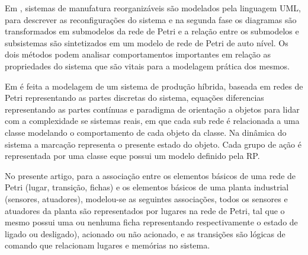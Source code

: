 Em \cite{design}, 
sistemas de manufatura reorganizáveis são modelados pela linguagem UML, para descrever as reconfigurações do sistema e na segunda fase  os diagramas são transformados em submodelos da rede de Petri e a relação entre os submodelos e subsistemas são sintetizados em um modelo de rede de Petri de auto nível. Os dois métodos podem analisar comportamentos importantes em relação as propriedades do sistema que são vitais para a modelagem prática dos mesmos.

Em \cite{hybridOO} 
é feita a modelagem de um sistema de produção híbrida, baseada em redes de Petri representando as partes discretas do sistema, equações diferencias representando as partes contínuas e paradigma de orientação a objetos para lidar com a complexidade se sistemas reais, em que cada sub rede é relacionada a uma classe modelando o comportamento de cada objeto da classe. Na dinâmica do sistema a marcação representa o presente estado do objeto. Cada grupo de ação é representada por uma classe eque possui um modelo definido pela RP. 

No presente artigo, para a associação entre os elementos básicos de uma rede de Petri (lugar, transição, fichas) e os elementos básicos de uma planta industrial (sensores, atuadores), modelou-se as seguintes associações, todos os sensores e atuadores da planta são representados por lugares na rede de Petri, tal que o mesmo possui uma ou nenhuma ficha representando respectivamente o estado de ligado ou desligado), acionado ou não acionado, e as transições são lógicas de comando que relacionam lugares e memórias no sistema. 





\begin{comment}   

\section{Objetivos}
\subsection{Objetivos gerais}


\subsection{Objetivos específicos}
\begin{itemize}
    \item Modelagem ... ;
    \item Abordagem ...;
    \item Implementação ....; 
\end{itemize}

\end{comment}

